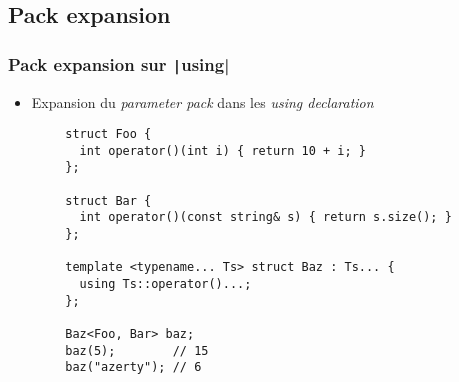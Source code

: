 \documentclass[C++.tex]{subfiles}
\begin{document}
\subsection*{Pack expansion}
\begin{frame}[fragile]
	\frametitle{Pack expansion sur \texttt|using|}
	\begin{itemize}
		\item Expansion du \textit{parameter pack} dans les \textit{using declaration}
	\end{itemize}

	\begin{verbatim}
		struct Foo {
		  int operator()(int i) { return 10 + i; }
		};

		struct Bar {
		  int operator()(const string& s) { return s.size(); }
		};

		template <typename... Ts> struct Baz : Ts... {
		  using Ts::operator()...;
		};

		Baz<Foo, Bar> baz;
		baz(5);        // 15
		baz("azerty"); // 6
	\end{verbatim}


\end{frame}
\end{document}
